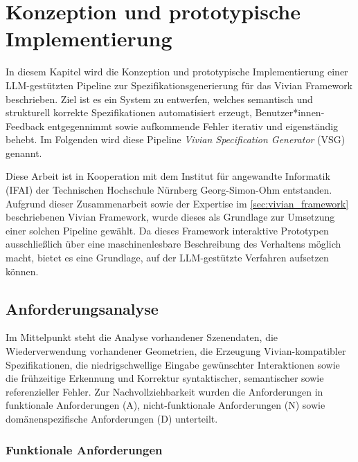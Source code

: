 \chapter{Konzeption und prototypische Implementierung}\label{ch:konzeption_und_implementierung}

In diesem Kapitel wird die Konzeption und prototypische Implementierung einer LLM-gestützten Pipeline zur Spezifikationsgenerierung für das Vivian Framework beschrieben. Ziel ist es ein System zu entwerfen, welches semantisch und strukturell korrekte Spezifikationen automatisiert erzeugt, Benutzer*innen-Feedback entgegennimmt sowie aufkommende Fehler iterativ und eigenständig behebt. Im Folgenden wird diese Pipeline \textit{Vivian Specification Generator} (VSG) genannt.

Diese Arbeit ist in Kooperation mit dem Institut für angewandte Informatik (IFAI) der Technischen Hochschule Nürnberg Georg-Simon-Ohm entstanden. Aufgrund dieser Zusammenarbeit sowie der Expertise im \ref{sec:vivian_framework} beschriebenen Vivian Framework, wurde dieses als Grundlage zur Umsetzung einer solchen Pipeline gewählt. Da dieses Framework interaktive Prototypen ausschließlich über eine maschinenlesbare Beschreibung des Verhaltens möglich macht, bietet es eine Grundlage, auf der LLM-gestützte Verfahren aufsetzen können.


\section{Anforderungsanalyse}

Im Mittelpunkt steht die Analyse vorhandener Szenendaten, die Wiederverwendung vorhandener Geometrien, die Erzeugung Vivian-kompatibler Spezifikationen, die niedrigschwellige Eingabe gewünschter Interaktionen sowie die frühzeitige Erkennung und Korrektur syntaktischer, semantischer sowie referenzieller Fehler.
Zur Nachvollziehbarkeit wurden die Anforderungen in funktionale Anforderungen (A), nicht-funktionale Anforderungen (N) sowie domänenspezifische Anforderungen (D) unterteilt.

\subsection*{Funktionale Anforderungen}

